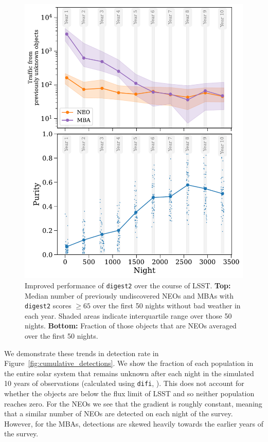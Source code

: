 \documentclass[twocolumn]{aastex631}
\newcommand{\dig}{\texttt{digest2}}
\begin{document}
\begin{figure}[htb]
    \centering
    \includegraphics[width=\columnwidth]{paper/figures/digest2_purity_over_lsst.pdf}
    \caption{Improved performance of \dig{} over the course of LSST. \textbf{Top:} Median number of previously undiscovered NEOs and MBAs with \dig{} scores $\ge 65$ over the first 50 nights without bad weather in each year. Shaded areas indicate interquartile range over those 50 nights. \textbf{Bottom:} Fraction of those objects that are NEOs averaged over the first 50 nights.}
    \label{fig:digest2_purity_improvements}
\end{figure}

We demonstrate these trends in detection rate in Figure~\ref{fig:cumulative_detections}. We show the fraction of each population in the entire solar system that remains unknown after each night in the simulated 10 years of observations (calculated using \texttt{difi}, \citealp{difi}). This does not account for whether the objects are below the flux limit of LSST and so neither population reaches zero. For the NEOs we see that the gradient is roughly constant, meaning that a similar number of NEOs are detected on each night of the survey. However, for the MBAs, detections are skewed heavily towards the earlier years of the survey.
\end{document}
